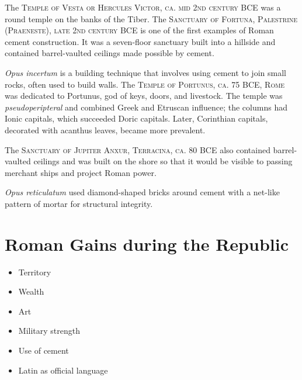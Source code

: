 \documentclass{article}
\begin{document}
The \textsc{Temple of Vesta or Hercules Victor, ca. mid 2nd century BCE} was a round temple on the banks of the Tiber.  The \textsc{Sanctuary of Fortuna, Palestrine (Praeneste), late 2nd century BCE} is one of the first examples of Roman cement construction.  It was a seven-floor sanctuary built into a hillside and contained barrel-vaulted ceilings made possible by cement.

\textit{Opus incertum} is a building technique that involves using cement to join small rocks, often used to build walls.  The \textsc{Temple of Portunus, ca. 75 BCE, Rome} was dedicated to Portunus, god of keys, doors, and livestock.  The temple was \textit{pseudoperipteral} and combined Greek and Etruscan influence; the columns had Ionic capitals, which succeeded Doric capitals.  Later, Corinthian capitals, decorated with acanthus leaves, became more prevalent.

The \textsc{Sanctuary of Jupiter Anxur, Terracina, ca. 80 BCE} also contained barrel-vaulted ceilings and was built on the shore so that it would be visible to passing merchant ships and project Roman power.

\textit{Opus reticulatum} used diamond-shaped bricks around cement with a net-like pattern of mortar for structural integrity.
\section{Roman Gains during the Republic}
\begin{itemize}
\item Territory
\item Wealth
\item Art
\item Military strength
\item Use of cement
\item Latin as official language
\end{itemize}
\end{document}
